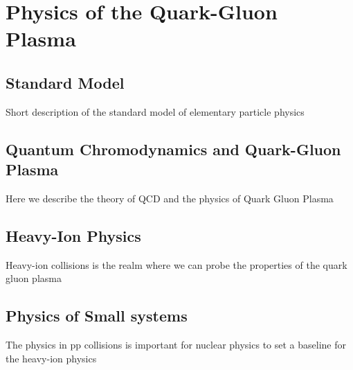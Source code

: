 \chapter{Physics of the Quark-Gluon Plasma}
\label{cap:1}

\vspace*{2cm}


\section{Standard Model}
\label{cap:1.1}
Short description of the standard model of elementary particle physics


\section{Quantum Chromodynamics and Quark-Gluon Plasma}
\label{cap:1.2}
Here we describe the theory of QCD and the physics of Quark Gluon Plasma

\section{Heavy-Ion Physics}
\label{cap:1.3}
Heavy-ion collisions is the realm where we can probe the properties of the quark gluon plasma

\section{Physics of Small systems}
\label{cap:1.4}
The physics in pp collisions is important for nuclear physics to set a baseline for the heavy-ion physics
